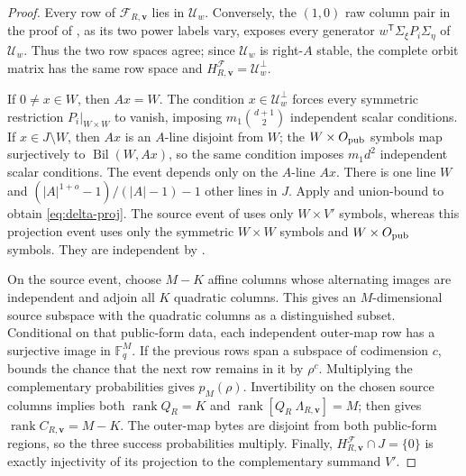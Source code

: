 \documentclass[11pt]{article}
\newcommand{\F}{\mathbb F}
\newcommand{\rank}{\operatorname{rank}}
\newcommand{\transpose}{\mathsf T}
\begin{document}
\begin{proof}
Every row of $\mathcal F_{R,\mathbf v}$ lies in $\mathcal U_w$.  Conversely,
the $(1,0)$ raw column pair in the proof of
, as its two power labels vary, exposes
every generator $w^\transpose\Sigma_\xi P_i\Sigma_\eta$ of $\mathcal U_w$.
Thus the two row spaces agree; since $\mathcal U_w$ is right-$A$ stable, the
complete orbit matrix has the same row space and
$H^{\mathcal F}_{R,\mathbf v}=\mathcal U_w^\perp$.

If $0\ne x\in W$, then $Ax=W$.  The condition $x\in\mathcal U_w^\perp$
forces every symmetric restriction $P_i|_{W\times W}$ to vanish, imposing
$m_1\binom{d+1}{2}$ independent scalar conditions.  If
$x\in J\setminus W$, then $Ax$ is an $A$-line disjoint from $W$; the
$W\times O_{\rm pub}$ symbols map surjectively to
$\operatorname{Bil}(W,Ax)$, so the same condition imposes $m_1d^2$
independent scalar conditions.  The event depends only on the $A$-line $Ax$.
There is one line $W$ and
$(|A|^{1+o}-1)/(|A|-1)-1$ other lines in $J$.  Apply
 and union-bound to obtain
\eqref{eq:delta-proj}.  The source event of
 uses only $W\times V'$ symbols,
whereas this projection event uses only the symmetric $W\times W$ symbols and
$W\times O_{\rm pub}$ symbols.  They are independent by
.

On the source event, choose $M-K$ affine columns whose alternating images are
independent and adjoin all $K$ quadratic columns.  This gives an
$M$-dimensional source subspace with the quadratic columns as a distinguished
subset.  Conditional on that public-form data, each independent outer-map row
has a surjective image in $\F_q^M$.  If the previous rows span a subspace of
codimension $c$,  bounds the chance that the
next row remains in it by $\rho^c$.  Multiplying the complementary
probabilities gives $p_M(\rho)$.  Invertibility on the chosen source columns
implies both $\rank Q_R=K$ and
$\rank[Q_R\ \Lambda_{R,\mathbf v}]=M$; then
 gives $\rank C_{R,\mathbf v}=M-K$.
The outer-map bytes are disjoint from both public-form regions, so the three
success probabilities multiply.  Finally,
$H^{\mathcal F}_{R,\mathbf v}\cap J=\{0\}$ is exactly injectivity of its
projection to the complementary summand $V'$.
\end{proof}
\end{document}
